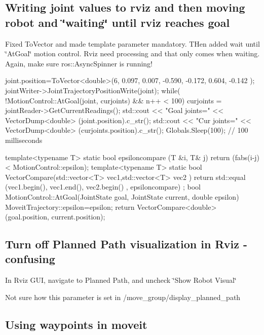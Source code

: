 \subsection*{Writing joint values to rviz and then moving robot and \char`\"{}waiting\char`\"{} until rviz reaches goal }

Fixed To\-Vector and made template parameter mandatory. T\-Hen added wait until \char`\"{}\-At\-Goal\char`\"{} motion control. Rviz need processing and that only comes when waiting. Again, make sure ros\-::\-Async\-Spinner is running! \begin{DoxyVerb}        joint.position=ToVector<double>(6, 0.097, 0.007, -0.590, -0.172, 0.604, -0.142 );
        jointWriter->JointTrajectoryPositionWrite(joint);
        while( !MotionControl::AtGoal(joint, curjoints) && n++ < 100) {
            curjoints = jointReader->GetCurrentReadings();
            std::cout << "Goal joints=" << VectorDump<double> (joint.position).c_str();
            std::cout << "Cur  joints=" << VectorDump<double> (curjoints.position).c_str();
            Globals.Sleep(100); // 100 milliseconds
        }

template<typename T>
static bool epsiloncompare (T &i, T& j) {
  return (fabs(i-j) < MotionControl::epsilon);
}
template<typename T>
static bool VectorCompare(std::vector<T> vec1,std::vector<T> vec2 )
{
   return std::equal (vec1.begin(), vec1.end(),  vec2.begin() , epsiloncompare) ;
}
bool MotionControl::AtGoal(JointState goal, JointState current,  double epsilon)
{
    MoveitTrajectory::epsilon=epsilon;
    return VectorCompare<double>(goal.position, current.position);
}
\end{DoxyVerb}


\subsection*{Turn off Planned Path visualization in Rviz -\/ confusing }

In Rviz G\-U\-I, navigate to Planned Path, and uncheck \char`\"{}\-Show Robot Visual\char`\"{}

Not sure how this parameter is set in /move\-\_\-group/display\-\_\-planned\-\_\-path

\subsection*{Using waypoints in moveit }

